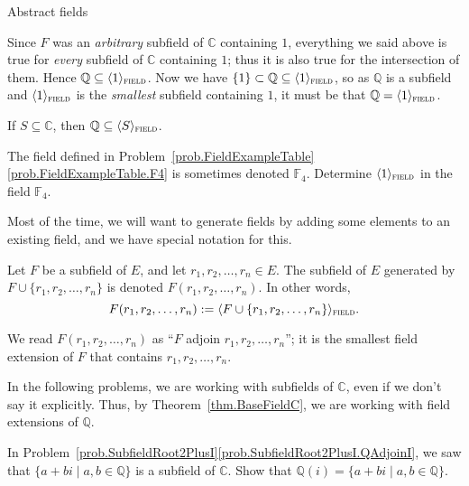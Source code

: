 \begin{section}{Abstract fields}
\begin{example}
Since $F$ was an \emph{arbitrary} subfield of $\mathbb{C}$ containing $1$, everything we said above  is true for \emph{every} subfield of $\mathbb{C}$ containing $1$; thus it is also true for the intersection of them. Hence $\mathbb{Q} \subseteq \langle 1 \rangle_{\textsc{field}}$. Now we have $\{1\} \subset \mathbb{Q} \subseteq \langle 1 \rangle_{\textsc{field}}$, so as $\mathbb{Q}$ is a subfield and $\langle 1 \rangle_{\textsc{field}}$ is the \emph{smallest} subfield containing $1$, it must be that $\mathbb{Q} = \langle 1 \rangle_{\textsc{field}}$.
\end{example}


\begin{theorem}\label{thm.BaseFieldC}
If $S\subseteq \mathbb{C}$, then  $\mathbb{Q} \subseteq \langle S \rangle_{\textsc{field}}$.
\end{theorem}

\begin{problem}
The field defined in Problem~\ref{prob.FieldExampleTable}\ref{prob.FieldExampleTable.F4} is sometimes denoted $\mathbb{F}_4$. Determine $\langle 1 \rangle_{\textsc{field}}$ in the field $\mathbb{F}_4$.
\end{problem}

Most of the time, we will want to generate fields by adding some elements to an existing field, and we have special notation for this.

\begin{notation}
Let $F$ be a subfield of $E$, and let $r_1,r_2,\ldots,r_n \in E$. The subfield of $E$ generated by $F\cup \{r_1,r_2,\ldots,r_n\}$ is denoted $F(r_1,r_2,\ldots,r_n)$. In other words, \[F(r_1,r_2,\ldots,r_n) := \langle F\cup \{r_1,r_2,\ldots,r_n\} \rangle_{\textsc{field}}.\]
\end{notation}

We read $F(r_1,r_2,\ldots,r_n)$  as ``$F$ adjoin $r_1,r_2,\ldots,r_n$''; it is the smallest field extension of $F$ that contains $r_1,r_2,\ldots,r_n$.

In the following problems, we are working with subfields of $\mathbb{C}$, even if we don't say it explicitly. Thus, by Theorem~\ref{thm.BaseFieldC}, we are working with field extensions of $\mathbb{Q}.$

\begin{problem}\label{prob.QAdjoinI}
In Problem~\ref{prob.SubfieldRoot2PlusI}\ref{prob.SubfieldRoot2PlusI.QAdjoinI}, we saw that $\{a+bi\mid a,b\in \mathbb{Q}\}$ is a subfield of $\mathbb{C}$. 
Show that $\mathbb{Q}(i) = \{a+bi\mid a,b\in \mathbb{Q}\}$. 
\end{problem}


\end{section}
